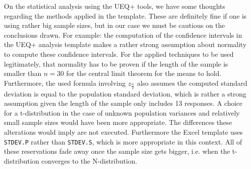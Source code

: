\documentclass[a4paper, 11pt]{article}
\begin{document}
On the statistical analysis using the UEQ+ tools, we have some thoughts regarding the methods applied in the template. These are definitely fine if one is using rather big sample sizes, but in our case we must be cautious on the conclusions drawn. For example: the computation of the confidence intervals in the UEQ+ analysis template makes a rather strong assumption about normality to  compute these confidence intervals. For the applied techniques to be used legitimately, that normality has to be proven if the length of the sample is smaller than $n = 30$ for the central limit theorem for the means to hold. Furthermore, the used formula involving $z_{\frac{\alpha}{2}}$ also assumes the computed standard deviation is equal to the population standard deviation, which is rather a strong assumption given the length of the sample only includes 13 responses. A choice for a t-distribution in the case of unknown population variances and relatively small sample sizes would have been more appropriate. The differences these alterations would imply are not executed. Furthermore the Excel template uses \texttt{STDEV.P} rather than \texttt{STDEV.S}, which is more appropriate in this context. All of these reservations fade away once the sample size gets bigger, i.e. when the t-distribution converges to the N-distribution.\\

\newpage
\appendix
\end{document}
